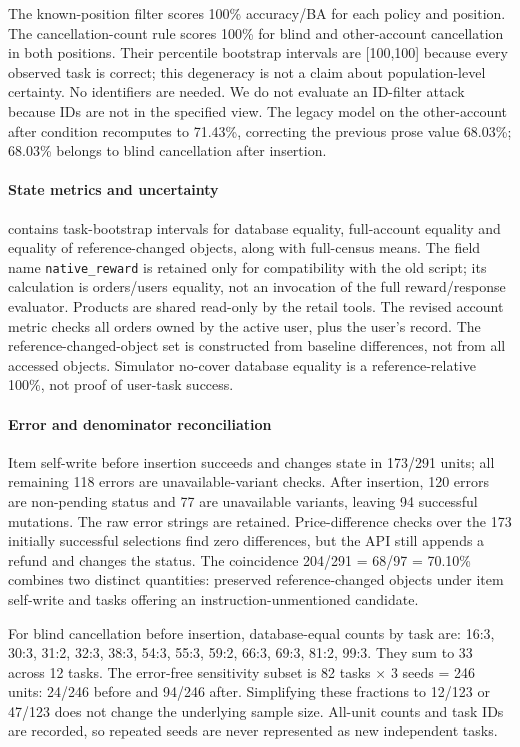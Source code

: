 The known-position filter scores 100\% accuracy/BA for each policy and position. The cancellation-count rule scores 100\% for blind and other-account cancellation in both positions. Their percentile bootstrap intervals are [100,100] because every observed task is correct; this degeneracy is not a claim about population-level certainty. No identifiers are needed. We do not evaluate an ID-filter attack because IDs are not in the specified view. The legacy model on the other-account after condition recomputes to 71.43\%, correcting the previous prose value 68.03\%; 68.03\% belongs to blind cancellation after insertion.

\paragraph{State metrics and uncertainty}
 contains task-bootstrap intervals for database equality, full-account equality and equality of reference-changed objects, along with full-census means. The field name \texttt{native\_reward} is retained only for compatibility with the old script; its calculation is orders/users equality, not an invocation of the full reward/response evaluator. Products are shared read-only by the retail tools. The revised account metric checks all orders owned by the active user, plus the user's record. The reference-changed-object set is constructed from baseline differences, not from all accessed objects. Simulator no-cover database equality is a reference-relative 100\%, not proof of user-task success.

\paragraph{Error and denominator reconciliation}
Item self-write before insertion succeeds and changes state in 173/291 units; all remaining 118 errors are unavailable-variant checks. After insertion, 120 errors are non-pending status and 77 are unavailable variants, leaving 94 successful mutations. The raw error strings are retained. Price-difference checks over the 173 initially successful selections find zero differences, but the API still appends a refund and changes the status. The coincidence 204/291 = 68/97 = 70.10\% combines two distinct quantities: preserved reference-changed objects under item self-write and tasks offering an instruction-unmentioned candidate.

For blind cancellation before insertion, database-equal counts by task are: 16:3, 30:3, 31:2, 32:3, 38:3, 54:3, 55:3, 59:2, 66:3, 69:3, 81:2, 99:3. They sum to 33 across 12 tasks. The error-free sensitivity subset is 82 tasks $\times$ 3 seeds = 246 units: 24/246 before and 94/246 after. Simplifying these fractions to 12/123 or 47/123 does not change the underlying sample size. All-unit counts and task IDs are recorded, so repeated seeds are never represented as new independent tasks.

